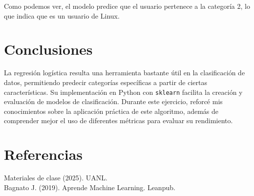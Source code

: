 \documentclass{article}
\begin{document}
Como podemos ver, el modelo predice que el usuario pertenece a la categoría 2, lo que indica que es un usuario de Linux.

\section{Conclusiones}

La regresión logística resulta una herramienta bastante útil en la clasificación de datos, permitiendo predecir categorías específicas a partir de ciertas características. Su implementación en Python con \texttt{sklearn} facilita la creación y evaluación de modelos de clasificación. Durante este ejercicio, reforcé mis conocimientos sobre la aplicación práctica de este algoritmo, además de comprender mejor el uso de diferentes métricas para evaluar su rendimiento. 

\section{Referencias}
Materiales de clase (2025). UANL.\\
Bagnato J. (2019). Aprende Machine Learning. Leanpub.
\end{document}
